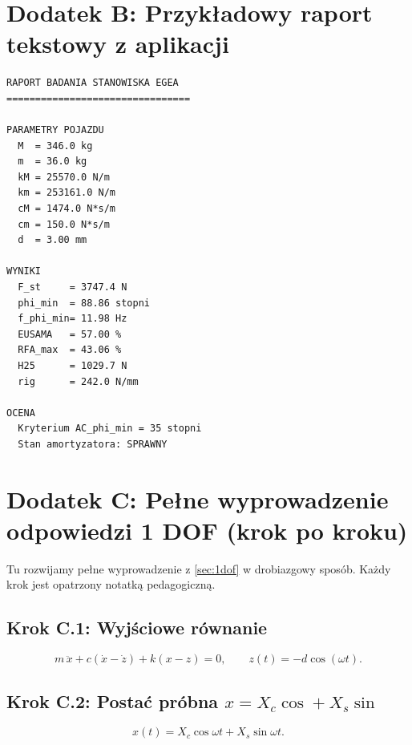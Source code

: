 \documentclass[11pt,a4paper]{article}
\theoremstyle{plainpol}
\begin{document}
\section{Dodatek B: Przykładowy raport tekstowy z aplikacji}

\begin{lstlisting}[basicstyle=\ttfamily\footnotesize, frame=single,
                   backgroundcolor=\color{codebg}, breaklines=true]
RAPORT BADANIA STANOWISKA EGEA
================================

PARAMETRY POJAZDU
  M  = 346.0 kg
  m  = 36.0 kg
  kM = 25570.0 N/m
  km = 253161.0 N/m
  cM = 1474.0 N*s/m
  cm = 150.0 N*s/m
  d  = 3.00 mm

WYNIKI
  F_st     = 3747.4 N
  phi_min  = 88.86 stopni
  f_phi_min= 11.98 Hz
  EUSAMA   = 57.00 %
  RFA_max  = 43.06 %
  H25      = 1029.7 N
  rig      = 242.0 N/mm

OCENA
  Kryterium AC_phi_min = 35 stopni
  Stan amortyzatora: SPRAWNY
\end{lstlisting}

\section{Dodatek C: Pełne wyprowadzenie odpowiedzi 1 DOF (krok po kroku)}

Tu rozwijamy pełne wyprowadzenie z \cref{sec:1dof} w drobiazgowy sposób.
Każdy krok jest opatrzony notatką pedagogiczną.

\subsection*{Krok C.1: Wyjściowe równanie}

\begin{equation}
  m\,\ddot{x} + c(\dot{x} - \dot{z}) + k(x - z) = 0,\qquad z(t) = -d\cos(\omega t).
  \tag{1DOF}
\end{equation}

\subsection*{Krok C.2: Postać próbna $x = X_c\cos + X_s\sin$}

\begin{equation}
  x(t) = X_c\cos\omega t + X_s\sin\omega t.
\end{equation}
\end{document}
